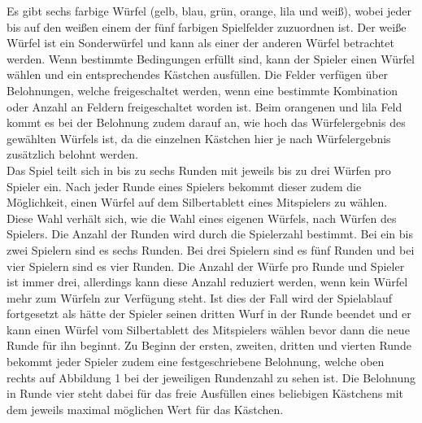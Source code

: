 Es gibt sechs farbige Würfel (gelb, blau, grün, orange, lila und weiß), wobei jeder bis auf den weißen einem der fünf farbigen Spielfelder zuzuordnen ist. Der weiße Würfel ist ein Sonderwürfel und kann als einer der anderen Würfel betrachtet werden. Wenn bestimmte Bedingungen erfüllt sind, kann der Spieler einen Würfel wählen und ein entsprechendes Kästchen ausfüllen. Die Felder verfügen über Belohnungen, welche freigeschaltet werden, wenn eine bestimmte Kombination oder Anzahl an Feldern freigeschaltet worden ist. Beim orangenen und lila Feld kommt es bei der Belohnung zudem darauf an, wie hoch das Würfelergebnis des gewählten Würfels ist, da die einzelnen Kästchen hier je nach Würfelergebnis zusätzlich belohnt werden.
\\
Das Spiel teilt sich in bis zu sechs Runden mit jeweils bis zu drei Würfen pro Spieler ein. Nach jeder Runde eines Spielers bekommt dieser zudem die Möglichkeit, einen Würfel auf dem Silbertablett eines Mitspielers zu wählen. Diese Wahl verhält sich, wie die Wahl eines eigenen Würfels, nach Würfen des Spielers. Die Anzahl der Runden wird durch die Spielerzahl bestimmt. Bei ein bis zwei Spielern sind es sechs Runden. Bei drei Spielern sind es fünf Runden und bei vier Spielern sind es vier Runden. Die Anzahl der Würfe pro Runde und Spieler ist immer drei, allerdings kann diese Anzahl reduziert werden, wenn kein Würfel mehr zum Würfeln zur Verfügung steht. Ist dies der Fall wird der Spielablauf fortgesetzt als hätte der Spieler seinen dritten Wurf in der Runde beendet und er kann einen Würfel vom Silbertablett des Mitspielers wählen bevor dann die neue Runde für ihn beginnt. Zu Beginn der ersten, zweiten, dritten und vierten Runde bekommt jeder Spieler zudem eine festgeschriebene Belohnung, welche oben rechts auf Abbildung 1 bei der jeweiligen Rundenzahl zu sehen ist. Die Belohnung in Runde vier steht dabei für das freie Ausfüllen eines beliebigen Kästchens mit dem jeweils maximal möglichen Wert für das Kästchen.

